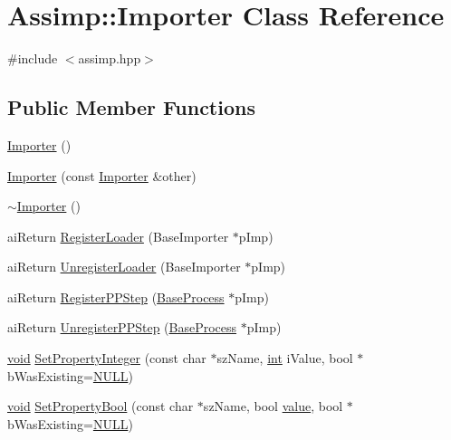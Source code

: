 \hypertarget{class_assimp_1_1_importer}{\section{Assimp\-:\-:Importer Class Reference}
\label{class_assimp_1_1_importer}
}


{\ttfamily \#include $<$assimp.\-hpp$>$}

\subsection*{Public Member Functions}
\begin{DoxyCompactItemize}
\item 
\hyperlink{class_assimp_1_1_importer_a2c207299ed05f1db1ad1e6dab005f719}{Importer} ()
\item 
\hyperlink{class_assimp_1_1_importer_a69743664b5a7a8c195be48265144317b}{Importer} (const \hyperlink{class_assimp_1_1_importer}{Importer} \&other)
\item 
\hyperlink{class_assimp_1_1_importer_a3d65af5286ba22f46220a72a6eb2a1c9}{$\sim$\-Importer} ()
\item 
ai\-Return \hyperlink{class_assimp_1_1_importer_a3846294ffe76d91a1d3096d22d7c6b7d}{Register\-Loader} (Base\-Importer $\ast$p\-Imp)
\item 
ai\-Return \hyperlink{class_assimp_1_1_importer_a3b1f5af2c763b13aca0f324b19001722}{Unregister\-Loader} (Base\-Importer $\ast$p\-Imp)
\item 
ai\-Return \hyperlink{class_assimp_1_1_importer_a102650d3648c0e414a1e73bdad9bed35}{Register\-P\-P\-Step} (\hyperlink{class_assimp_1_1_importer_a7624adc48d8bacb15f1f29efa2c9c63b}{Base\-Process} $\ast$p\-Imp)
\item 
ai\-Return \hyperlink{class_assimp_1_1_importer_a3a683671c7c40638b1103c5d3648d86c}{Unregister\-P\-P\-Step} (\hyperlink{class_assimp_1_1_importer_a7624adc48d8bacb15f1f29efa2c9c63b}{Base\-Process} $\ast$p\-Imp)
\item 
\hyperlink{wglew_8h_aeea6e3dfae3acf232096f57d2d57f084}{void} \hyperlink{class_assimp_1_1_importer_aa50eba6120a9b9805d0c2b02f1187165}{Set\-Property\-Integer} (const char $\ast$sz\-Name, \hyperlink{wglew_8h_a500a82aecba06f4550f6849b8099ca21}{int} i\-Value, bool $\ast$b\-Was\-Existing=\hyperlink{ftobjs_8h_a070d2ce7b6bb7e5c05602aa8c308d0c4}{N\-U\-L\-L})
\item 
\hyperlink{wglew_8h_aeea6e3dfae3acf232096f57d2d57f084}{void} \hyperlink{class_assimp_1_1_importer_acf161a9fdd0d2ed3902e325351311389}{Set\-Property\-Bool} (const char $\ast$sz\-Name, bool \hyperlink{fmod__dsp_8h_a6a4f8a1a444e9080b297963b3db29fe0}{value}, bool $\ast$b\-Was\-Existing=\hyperlink{ftobjs_8h_a070d2ce7b6bb7e5c05602aa8c308d0c4}{N\-U\-L\-L})

\end{DoxyCompactItemize}
